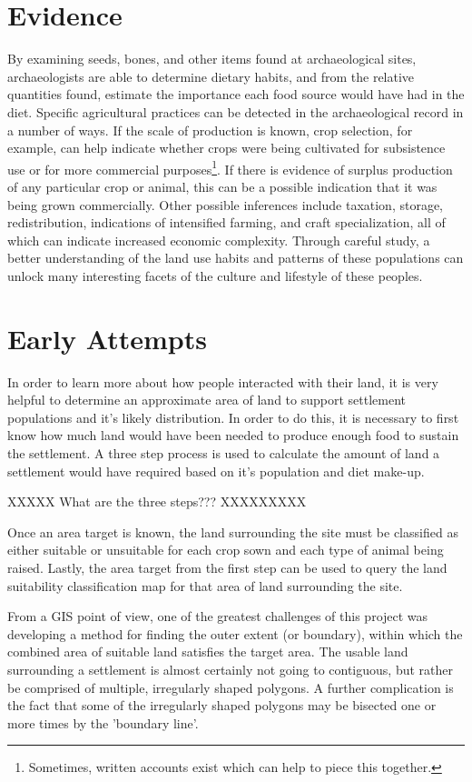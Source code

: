 \section{Evidence} \label{sec:Evidence} By examining seeds, bones, and other
items found at archaeological sites, archaeologists are able to determine 
dietary habits, and from the relative quantities found, estimate the
importance each food source would have had in the diet.  Specific agricultural practices
can be detected in the archaeological record in a number of ways.  If the scale
of production is known, crop selection, for example, can help indicate whether
crops were being cultivated for subsistence use or for more commercial
purposes\footnote{Sometimes, written accounts exist which can help to
piece this together.}.  If there is evidence of surplus production of any
particular crop or animal, this can be a possible indication that it was being
grown commercially.  Other possible inferences include taxation, storage,
redistribution, indications of intensified farming, and craft specialization,
all of which can indicate increased economic complexity.  Through careful
study, a better understanding of the land use habits and patterns of these
populations can unlock many interesting facets of the culture and lifestyle of
these peoples.

\section{Early Attempts} \label{sec:EarlyAttempts} 

In order to learn more about how people interacted with their land, it is very
helpful to determine an approximate area of land to support settlement
populations and it's likely distribution.  In order to do this, it is necessary
to first know how much land would have been needed to produce enough food to
sustain the settlement.  A three step process is used to calculate the amount of
land a settlement would have required based on it's population and diet
make-up.  

XXXXX What are the three steps???  XXXXXXXXX

Once an area target is known, the land surrounding the
site must be classified as either suitable or unsuitable for each crop sown and
each type of animal being raised.  Lastly, the area target from the first step
can be used to query the land suitability classification map for that area of
land surrounding the site.

From a GIS point of view, one of the greatest challenges of this project was
developing a method for finding the outer extent (or boundary), within which
the combined area of suitable land satisfies the target area.  The usable land
surrounding a settlement is almost certainly not going to contiguous, but
rather be comprised of multiple, irregularly shaped polygons. A further
complication is the fact that some of the irregularly shaped polygons may
be bisected one or more times by the 'boundary line'.  

